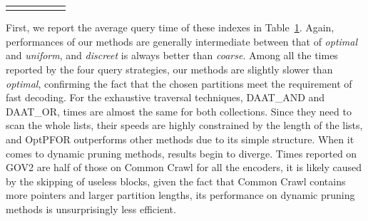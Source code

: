 \documentclass[runningheads]{comsis2}
\begin{document}
\begin{table}
\begin{tabular}{@{}ll*{4}{r}}
		\bottomrule
		\label{tab:efficiency}
	\end{tabular}
\end{table}

First, we report the average query time of these indexes in Table~\ref{tab:efficiency}.
Again, performances of our methods are generally intermediate between that of \textit{optimal} and \textit{uniform}, and \textit{discreet} is always better than \textit{coarse}.
Among all the times reported by the four query strategies, our methods are slightly slower than \textit{optimal}, confirming the fact that the chosen partitions meet the requirement of fast decoding.
For the exhaustive traversal techniques, DAAT\_AND and DAAT\_OR, times are almost the same for both collections.
Since they need to scan the whole lists, their speeds are highly constrained by the length of the lists, and OptPFOR outperforms other methods due to its simple structure.
When it comes to dynamic pruning methods, results begin to diverge.
Times reported on GOV2 are half of those on Common Crawl for all the encoders, it is likely caused by the skipping of useless blocks, given the fact that Common Crawl contains more pointers and larger partition lengths, its performance on dynamic pruning methods is unsurprisingly less efficient.
\end{document}
